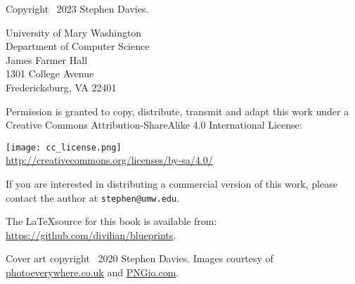 
\thispagestyle{empty}

Copyright \textcopyright \ 2023 Stephen Davies.

\bigskip

University of Mary Washington\\
Department of Computer Science\\
James Farmer Hall\\
1301 College Avenue\\
Fredericksburg, VA  22401

\vspace{.4in}

Permission is granted to copy, distribute, transmit and adapt this work under a
Creative Commons Attribution-ShareAlike 4.0 International License:

\begin{center}
\texttt{[image: cc\_license.png]}\\
\smallskip
\url{http://creativecommons.org/licenses/by-sa/4.0/}
\end{center}

\vspace{.2in}
If you are interested in distributing a commercial version of this work, please
contact the author at \texttt{stephen@umw.edu}.

\vspace{.4in}
The \LaTeX source for this book is available from:
\url{https://github.com/divilian/blueprints}.

\vspace{1.8in}
Cover art copyright \textcopyright \ 2020 Stephen Davies.
Images courtesy of \url{photoeverywhere.co.uk} and \url{PNGio.com}.
